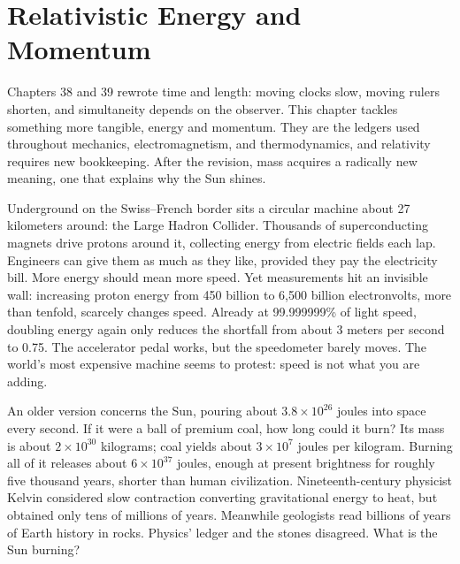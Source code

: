 \chapter{Relativistic Energy and Momentum}

Chapters 38 and 39 rewrote time and length: moving clocks slow, moving rulers shorten, and simultaneity depends on the observer. This chapter tackles something more tangible, energy and momentum. They are the ledgers used throughout mechanics, electromagnetism, and thermodynamics, and relativity requires new bookkeeping. After the revision, mass acquires a radically new meaning, one that explains why the Sun shines.


\begin{mainline}
Underground on the Swiss--French border sits a circular machine about 27 kilometers around: the Large Hadron Collider. Thousands of superconducting magnets drive protons around it, collecting energy from electric fields each lap. Engineers can give them as much as they like, provided they pay the electricity bill. More energy should mean more speed. Yet measurements hit an invisible wall: increasing proton energy from 450 billion to 6,500 billion electronvolts, more than tenfold, scarcely changes speed. Already at 99.999999\% of light speed, doubling energy again only reduces the shortfall from about 3 meters per second to 0.75. The accelerator pedal works, but the speedometer barely moves. The world's most expensive machine seems to protest: speed is not what you are adding.

An older version concerns the Sun, pouring about \(3.8\times10^{26}\) joules into space every second. If it were a ball of premium coal, how long could it burn? Its mass is about \(2\times10^{30}\) kilograms; coal yields about \(3\times10^{7}\) joules per kilogram. Burning all of it releases about \(6\times10^{37}\) joules, enough at present brightness for roughly five thousand years, shorter than human civilization. Nineteenth-century physicist Kelvin considered slow contraction converting gravitational energy to heat, but obtained only tens of millions of years. Meanwhile geologists read billions of years of Earth history in rocks. Physics' ledger and the stones disagreed. What is the Sun burning?


\end{mainline}
